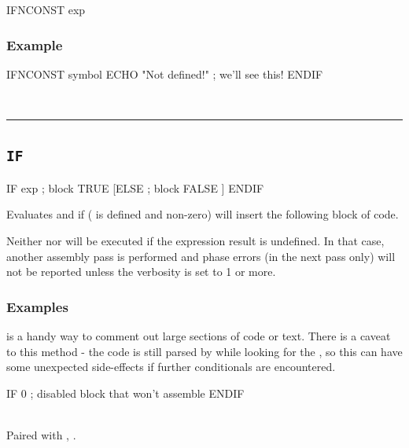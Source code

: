\begin{usage}
  IFNCONST exp
\end{usage}

\subsubsection{Example}
\begin{code}
IFNCONST symbol
    ECHO "Not defined!"  ; we'll see this!
ENDIF
\end{code}\\



\hrule
\subsection{\texttt{IF}}
\label{pseudoop:if}

\begin{usage}
  IF exp
    ; block TRUE
  [ELSE
    ; block FALSE
  ]
  ENDIF
\end{usage}

Evaluates  and if  ( is defined and non-zero) will insert the following block of code.


Neither  nor  will be executed if the expression result
is undefined.  In that case, another assembly
pass is performed and phase errors (in the next pass only) will not
be reported unless the verbosity is set to 1 or more.

\subsubsection{Examples}

 is a handy way to comment out large sections of code or text. There is a caveat to this method - the code is still parsed by \dasm while looking for the , so this can have some unexpected side-effects if further conditionals are encountered.

\begin{code}
  IF 0
    ; disabled block that won't assemble
  ENDIF
\end{code}\\



Paired with , .\\

